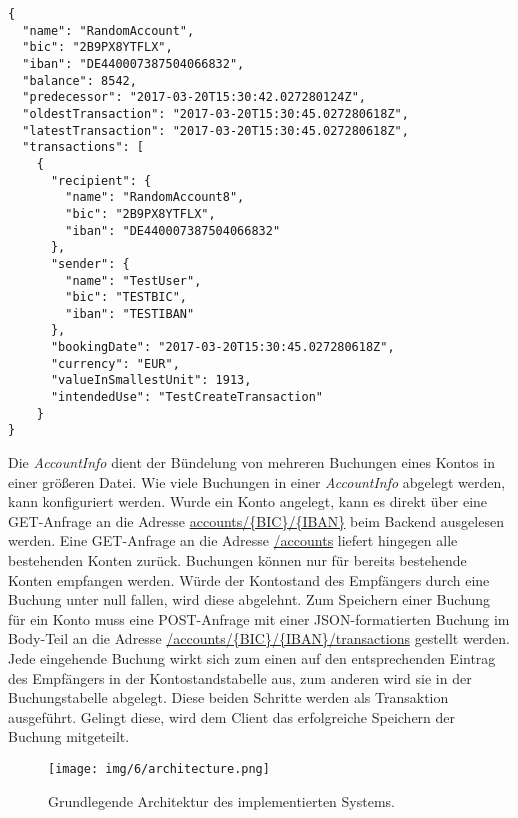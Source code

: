 \documentclass[12pt,oneside,a4paper,parskip]{scrbook}
\begin{document}
\begin{lstlisting}[label=lst:accountinfoJson,
           language={},
           firstnumber=1,
           caption=AccountInfo im JSON-Format.]           
{
  "name": "RandomAccount",
  "bic": "2B9PX8YTFLX",
  "iban": "DE440007387504066832",
  "balance": 8542,
  "predecessor": "2017-03-20T15:30:42.027280124Z",
  "oldestTransaction": "2017-03-20T15:30:45.027280618Z",
  "latestTransaction": "2017-03-20T15:30:45.027280618Z",
  "transactions": [
    {
      "recipient": {
        "name": "RandomAccount8",
        "bic": "2B9PX8YTFLX",
        "iban": "DE440007387504066832"
      },
      "sender": {
        "name": "TestUser",
        "bic": "TESTBIC",
        "iban": "TESTIBAN"
      },
      "bookingDate": "2017-03-20T15:30:45.027280618Z",
      "currency": "EUR",
      "valueInSmallestUnit": 1913,
      "intendedUse": "TestCreateTransaction"
    }
}
\end{lstlisting}

Die \textit{AccountInfo} dient der Bündelung von mehreren Buchungen eines Kontos in einer größeren Datei. Wie viele Buchungen in einer \textit{AccountInfo} abgelegt werden, kann konfiguriert werden. Wurde ein Konto angelegt, kann es direkt über eine GET-Anfrage an die Adresse \url{accounts/{BIC}/{IBAN}} beim Backend ausgelesen werden. Eine GET-Anfrage an die Adresse \url{/accounts} liefert hingegen alle bestehenden Konten zurück. Buchungen können nur für bereits bestehende Konten empfangen werden. Würde der Kontostand des Empfängers durch eine Buchung unter null fallen, wird diese abgelehnt. Zum Speichern einer Buchung für ein Konto muss eine POST-Anfrage mit einer JSON-formatierten Buchung im Body-Teil an die Adresse \url{/accounts/{BIC}/{IBAN}/transactions} gestellt werden. Jede eingehende Buchung wirkt sich zum einen auf den entsprechenden Eintrag des Empfängers in der Kontostandstabelle aus, zum anderen wird sie in der Buchungstabelle abgelegt. Diese beiden Schritte werden als Transaktion ausgeführt. Gelingt diese, wird dem Client das erfolgreiche Speichern der Buchung mitgeteilt.


\begin{figure}
  \centering
  \texttt{[image: img/6/architecture.png]}
  \caption[Grundlegende Architektur des implementierten Systems]{ Grundlegende Architektur des implementierten Systems.}
  \label{architectureImpl}
\end{figure}
\end{document}
